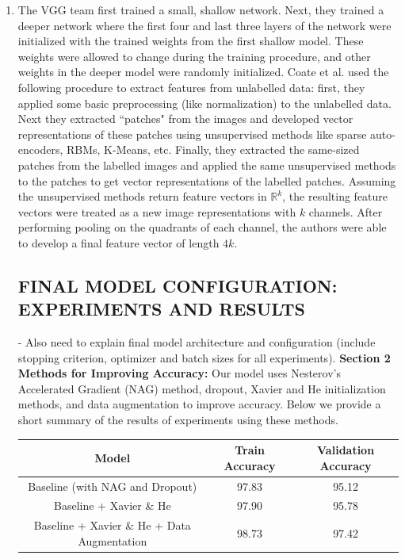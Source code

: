 \documentclass[a4paper]{article}
\begin{document}
\begin{enumerate}
{}
\item{ The VGG team first trained a small, shallow network. Next, they trained a deeper network where the first four and last three layers of the network were initialized with the trained weights from the first shallow model. These weights were allowed to change during the training procedure, and other weights in the deeper model were randomly initialized. 
\newline
\newline 
Coate et al. used the following procedure to extract features from unlabelled data: first, they applied some basic preprocessing (like normalization) to the unlabelled data. Next they extracted ``patches" from the images and developed vector representations of these patches using unsupervised methods like sparse auto-encoders, RBMs, K-Means, etc. Finally, they extracted the same-sized patches from the labelled images and applied the same unsupervised methods to the patches to get vector representations of the labelled patches. Assuming the unsupervised methods return feature vectors in $\mathbb{R}^k$, the resulting feature vectors were treated as a new image representations with $k$ channels. After performing pooling on the quadrants of each channel, the authors were able to develop a final feature vector of length $4k$. 

\subsection*{FINAL MODEL CONFIGURATION: EXPERIMENTS AND RESULTS}
- Also need to explain final model architecture and configuration (include stopping criterion, optimizer and batch sizes for all experiments).
\newline
\newline
\textbf{Section 2 Methods for Improving Accuracy:}
\newline
\newline
Our model uses Nesterov's Accelerated Gradient (NAG) method, dropout, Xavier and He initialization methods, and data augmentation to improve accuracy. Below we provide a short summary of the results of experiments using these methods. 

\begin{center}
\begin{tabular}{ |c|c|c| } 
 \hline
 Model & Train Accuracy & Validation Accuracy \\ \hline
 Baseline (with NAG and Dropout) & 97.83 & 95.12 \\ 
 Baseline + Xavier \& He & 97.90 & 95.78 \\ 
 Baseline + Xavier \& He + Data Augmentation & 98.73 & 97.42 \\ 
 \hline
\end{tabular}
\end{center}

}
\end{enumerate}
\end{document}
